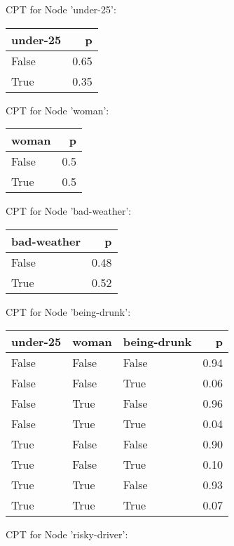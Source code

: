 
CPT for Node 'under-25':

\begin{tabular}{lr}
\toprule
 under-25 &    p \\
\midrule
    False & 0.65 \\
     True & 0.35 \\
\bottomrule
\end{tabular}


CPT for Node 'woman':

\begin{tabular}{lr}
\toprule
 woman &   p \\
\midrule
 False & 0.5 \\
  True & 0.5 \\
\bottomrule
\end{tabular}


CPT for Node 'bad-weather':

\begin{tabular}{lr}
\toprule
 bad-weather &    p \\
\midrule
       False & 0.48 \\
        True & 0.52 \\
\bottomrule
\end{tabular}


CPT for Node 'being-drunk':

\begin{tabular}{lllr}
\toprule
 under-25 &  woman &  being-drunk &    p \\
\midrule
    False &  False &        False & 0.94 \\
    False &  False &         True & 0.06 \\
    False &   True &        False & 0.96 \\
    False &   True &         True & 0.04 \\
     True &  False &        False & 0.90 \\
     True &  False &         True & 0.10 \\
     True &   True &        False & 0.93 \\
     True &   True &         True & 0.07 \\
\bottomrule
\end{tabular}


CPT for Node 'risky-driver':


